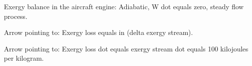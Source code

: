 Exergy balance in the aircraft engine:  
Adiabatic, W dot equals zero, steady flow process.  

Arrow pointing to:  
Exergy loss equals in (delta exergy stream).  

Arrow pointing to:  
Exergy loss dot equals exergy stream dot equals 100 kilojoules per kilogram.